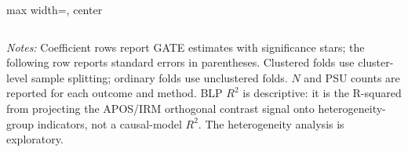 \begin{landscape}
\begin{table}[p]
\begin{adjustbox}{max width=\linewidth, center}
\begin{tabular}{lcccccccc}
\bottomrule
\end{tabular}
\end{adjustbox}
\par\vspace{3pt}
\begin{minipage}{\linewidth}\footnotesize \textit{Notes:} Coefficient rows report GATE estimates with significance stars; the following row reports standard errors in parentheses. Clustered folds use cluster-level sample splitting; ordinary folds use unclustered folds. $N$ and PSU counts are reported for each outcome and method. BLP $R^2$ is descriptive: it is the R-squared from projecting the APOS/IRM orthogonal contrast signal onto heterogeneity-group indicators, not a causal-model $R^2$. The heterogeneity analysis is exploratory.\end{minipage}
\end{table}
\end{landscape}
